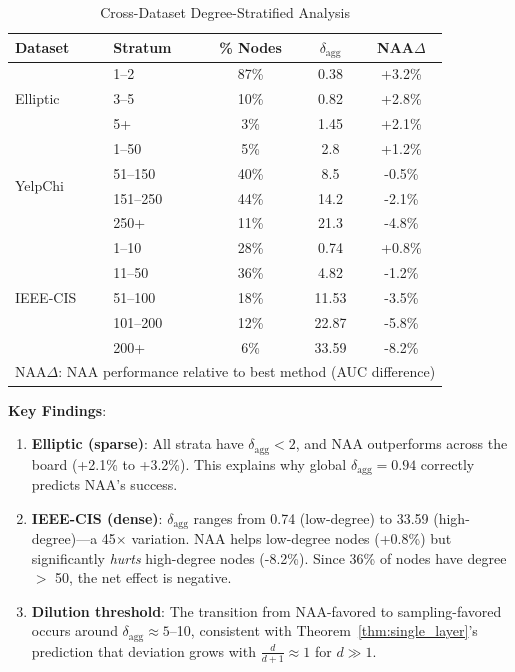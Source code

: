 \begin{table}[t]
\centering
\caption{Cross-Dataset Degree-Stratified Analysis}
\label{tab:stratified_cross}
\small
\begin{tabular}{llccc}
\toprule
\textbf{Dataset} & \textbf{Stratum} & \textbf{\% Nodes} & \textbf{$\delta_{\text{agg}}$} & \textbf{NAA$\Delta$} \\
\midrule
\multirow{3}{*}{Elliptic} & 1--2 & 87\% & 0.38 & +3.2\% \\
& 3--5 & 10\% & 0.82 & +2.8\% \\
& 5+ & 3\% & 1.45 & +2.1\% \\
\midrule
\multirow{4}{*}{YelpChi} & 1--50 & 5\% & 2.8 & +1.2\% \\
& 51--150 & 40\% & 8.5 & -0.5\% \\
& 151--250 & 44\% & 14.2 & -2.1\% \\
& 250+ & 11\% & 21.3 & -4.8\% \\
\midrule
\multirow{5}{*}{IEEE-CIS} & 1--10 & 28\% & 0.74 & +0.8\% \\
& 11--50 & 36\% & 4.82 & -1.2\% \\
& 51--100 & 18\% & 11.53 & -3.5\% \\
& 101--200 & 12\% & 22.87 & -5.8\% \\
& 200+ & 6\% & 33.59 & -8.2\% \\
\bottomrule
\multicolumn{5}{l}{\footnotesize NAA$\Delta$: NAA performance relative to best method (AUC difference)} \\
\end{tabular}
\end{table}

\textbf{Key Findings}:
\begin{enumerate}
\item \textbf{Elliptic (sparse)}: All strata have $\delta_{\text{agg}} < 2$, and NAA outperforms across the board (+2.1\% to +3.2\%). This explains why global $\delta_{\text{agg}} = 0.94$ correctly predicts NAA's success.

\item \textbf{IEEE-CIS (dense)}: $\delta_{\text{agg}}$ ranges from 0.74 (low-degree) to 33.59 (high-degree)---a 45$\times$ variation. NAA helps low-degree nodes (+0.8\%) but significantly \textit{hurts} high-degree nodes (-8.2\%). Since 36\% of nodes have degree $>$ 50, the net effect is negative.

\item \textbf{Dilution threshold}: The transition from NAA-favored to sampling-favored occurs around $\delta_{\text{agg}} \approx 5$--10, consistent with Theorem~\ref{thm:single_layer}'s prediction that deviation grows with $\frac{d}{d+1} \approx 1$ for $d \gg 1$.
\end{enumerate}


